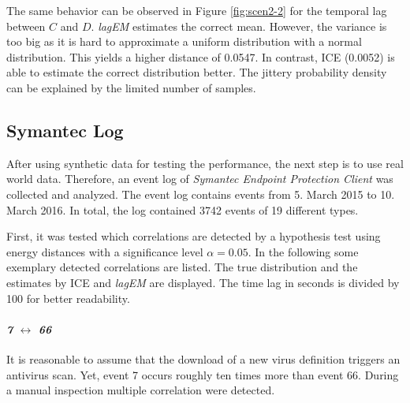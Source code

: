 \documentclass[conference]{IEEEtran}
\theoremstyle{examplestyle}
\begin{document}
The same behavior can be observed in Figure \ref{fig:scen2-2} for the temporal lag between \(C\) and \(D\). \textit{lagEM} estimates the correct mean. However, the variance is too big as it is hard to approximate a uniform distribution with a normal distribution. This yields a higher distance of 0.0547. In contrast, \ac{ICE} (0.0052) is able to estimate the correct distribution better. The jittery probability density can be explained by the limited number of samples.












\subsection{Symantec Log}
\label{sec:symantecLog}

After using synthetic data for testing the performance, the next step is to use real world data. Therefore, an event log of \textit{Symantec Endpoint Protection Client} was collected and analyzed. The event log contains events from 5. March 2015 to 10. March 2016. In total, the log contained 3742 events of 19 different types.



First, it was tested which correlations are detected by a hypothesis test using energy distances with a significance level \(\alpha = 0.05\). In the following some exemplary detected correlations are listed. The true distribution and the estimates by \ac{ICE} and \textit{lagEM} are displayed. The time lag in seconds is divided by 100 for better readability.


\paragraph{\textit{7} \(\leftrightarrow\) \textit{66}} It is reasonable to assume that the download of a new virus definition triggers an antivirus scan. Yet, event 7 occurs roughly ten times more than event 66. During a manual inspection multiple correlation were detected.
\end{document}
